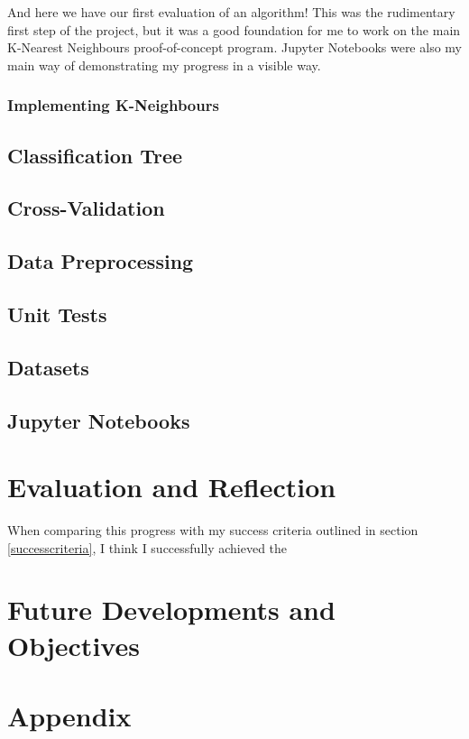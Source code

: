 \documentclass[letterpaper,10pt]{article}
\begin{document}
And here we have our first evaluation of an algorithm! This was the rudimentary first step of the project, but it was a good foundation for me to work on the main K-Nearest Neighbours proof-of-concept program. Jupyter Notebooks were also my main way of demonstrating my progress in a visible way. \par


\subsubsection{Implementing K-Neighbours}

\subsection{Classification Tree}
\subsection{Cross-Validation}
\subsection{Data Preprocessing}
\subsection{Unit Tests}
\subsection{Datasets}
\subsection{Jupyter Notebooks}

\newpage
\section{Evaluation and Reflection}
When comparing this progress with my success criteria outlined in section \ref{successcriteria}, I think I successfully achieved the
\section{Future Developments and Objectives}
\newpage




\appendix
\newpage
\section{Appendix}
\end{document}
